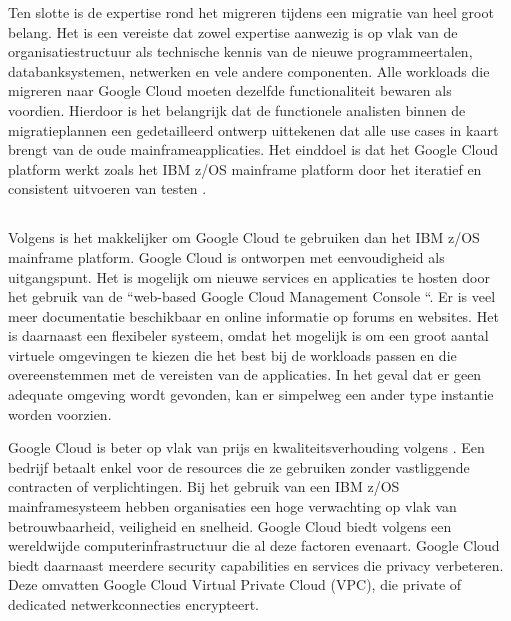Ten slotte is de expertise rond het migreren tijdens een migratie van heel groot belang. Het is een vereiste dat zowel expertise aanwezig is op vlak van de organisatiestructuur als technische kennis van de nieuwe programmeertalen, databanksystemen, netwerken en vele andere componenten. Alle workloads die migreren naar Google Cloud moeten dezelfde functionaliteit bewaren als voordien. Hierdoor is het belangrijk dat de functionele analisten binnen de migratieplannen een gedetailleerd ontwerp uittekenen dat alle use cases in kaart brengt van de oude mainframeapplicaties. Het einddoel is dat het Google Cloud platform werkt zoals het IBM z/OS mainframe platform door het iteratief en consistent uitvoeren van testen \autocite{Astadia2021}. 

\subsection{}
\label{sec:De voordelen van migreren naar Google Cloud volgens Astadia}

Volgens \textcite{Astadia2021} is het makkelijker om Google Cloud te gebruiken dan het IBM z/OS mainframe platform. Google Cloud is ontworpen met eenvoudigheid als uitgangspunt. Het is mogelijk om nieuwe services en applicaties te hosten door het gebruik van de ``web-based Google Cloud Management Console ``.  Er is veel meer documentatie beschikbaar en online informatie op forums en websites. Het is daarnaast een flexibeler systeem, omdat het mogelijk is om een groot aantal virtuele omgevingen te kiezen die het best bij de workloads passen en die overeenstemmen met de vereisten van de applicaties. In het geval dat er geen adequate omgeving wordt gevonden, kan er simpelweg een ander type instantie worden voorzien. 

Google Cloud is beter op vlak van prijs en kwaliteitsverhouding volgens \textcite{Astadia2021}. Een bedrijf betaalt enkel voor de resources die ze gebruiken zonder vastliggende contracten of verplichtingen. Bij het gebruik van een IBM z/OS mainframesysteem hebben organisaties een hoge verwachting op vlak van betrouwbaarheid, veiligheid en snelheid. Google Cloud biedt volgens \textcite{Astadia2021} een wereldwijde computerinfrastructuur die al deze factoren evenaart. Google Cloud biedt daarnaast meerdere security capabilities en services  die privacy verbeteren. Deze omvatten Google Cloud Virtual Private Cloud (VPC), die private of dedicated netwerkconnecties encrypteert. 

